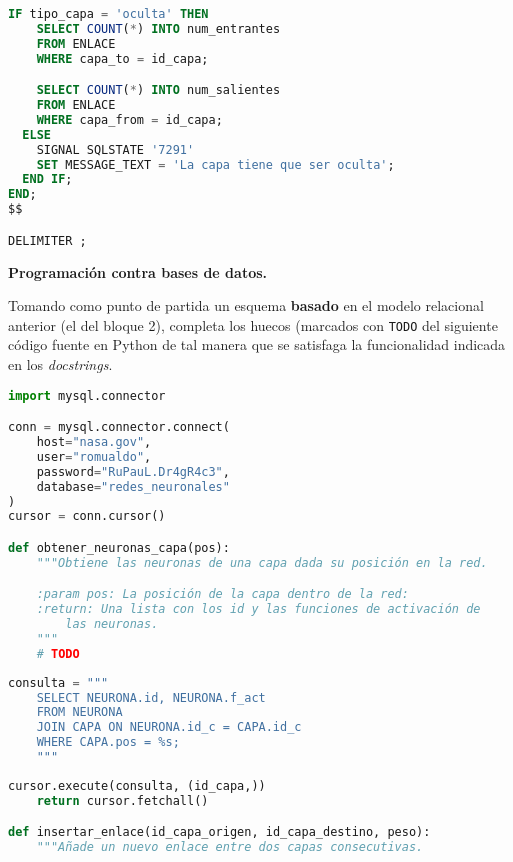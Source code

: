 \documentclass[
    12pt,
    a4paper,
    addpoints,
    answers,
    convocatoria=ord,
    titulacion=CD,
    curso=2024/2025,
]{db-exam}
\begin{document}
\begin{questions}
\begin{parts}
\begin{solution}
\begin{lstlisting}[language=sql]
  IF tipo_capa = 'oculta' THEN
    SELECT COUNT(*) INTO num_entrantes
    FROM ENLACE
    WHERE capa_to = id_capa;

    SELECT COUNT(*) INTO num_salientes
    FROM ENLACE
    WHERE capa_from = id_capa;
  ELSE
    SIGNAL SQLSTATE '7291'
    SET MESSAGE_TEXT = 'La capa tiene que ser oculta';
  END IF;
END;
$$

DELIMITER ;
\end{lstlisting}

\end{solution}

\end{parts}

\question[2] \textbf{Programación contra bases de datos.}

Tomando como punto de partida un esquema \textbf{basado} en el modelo relacional anterior (el del bloque 2), completa los huecos (marcados con \texttt{TODO} del siguiente código fuente en Python de tal manera que se satisfaga la funcionalidad indicada en los \textit{docstrings}.

\begin{lstlisting}[language=Python]
import mysql.connector

conn = mysql.connector.connect(
    host="nasa.gov",
    user="romualdo",
    password="RuPauL.Dr4gR4c3",
    database="redes_neuronales"
)
cursor = conn.cursor()

def obtener_neuronas_capa(pos):
    """Obtiene las neuronas de una capa dada su posición en la red.

    :param pos: La posición de la capa dentro de la red:
    :return: Una lista con los id y las funciones de activación de
        las neuronas.
    """
    # TODO
\end{lstlisting}

\begin{solutionorbox}
\begin{lstlisting}[language=Python]
    consulta = """
    SELECT NEURONA.id, NEURONA.f_act
    FROM NEURONA
    JOIN CAPA ON NEURONA.id_c = CAPA.id_c
    WHERE CAPA.pos = %s;
    """
\end{lstlisting}
\end{solutionorbox}

\begin{lstlisting}[language=Python]
    cursor.execute(consulta, (id_capa,))
    return cursor.fetchall()

def insertar_enlace(id_capa_origen, id_capa_destino, peso):
    """Añade un nuevo enlace entre dos capas consecutivas.
    

\end{lstlisting}
\end{questions}
\end{document}
